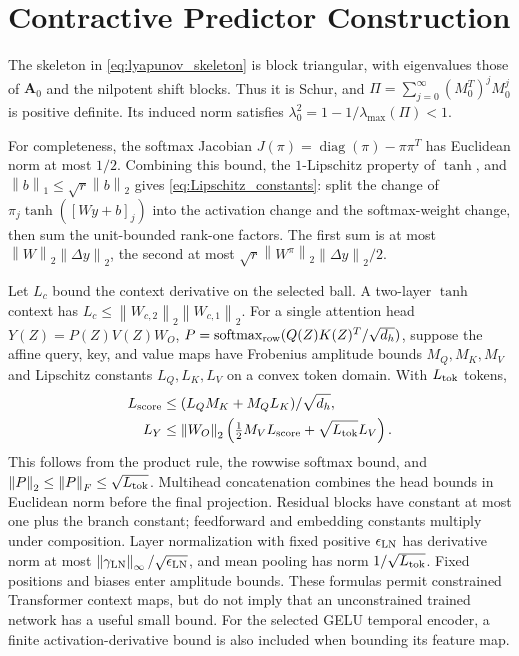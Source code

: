 \documentclass[journal]{IEEEtran}
\newcommand{\mA}{\mathbf{A}}
\newcommand{\norm}[1]{\left\lVert #1\right\rVert}
\begin{document}
\appendices
\section{Contractive Predictor Construction}
\label{app:construction}
The skeleton in \eqref{eq:lyapunov_skeleton} is block triangular, with eigenvalues those of $\mA_0$ and the nilpotent shift blocks. Thus it is Schur, and $\Pi=\sum_{j=0}^{\infty}(M_0^T)^jM_0^j$ is positive definite. Its induced norm satisfies $\lambda_0^2=1-1/\lambda_{\max}(\Pi)<1$.

For completeness, the softmax Jacobian $J(\pi)=\operatorname{diag}(\pi)-\pi\pi^T$ has Euclidean norm at most $1/2$. Combining this bound, the $1$-Lipschitz property of $\tanh$, and $\norm{b}_1\le\sqrt r\norm{b}_2$ gives \eqref{eq:Lipschitz_constants}: split the change of $\pi_j\tanh([Wy+b]_j)$ into the activation change and the softmax-weight change, then sum the unit-bounded rank-one factors. The first sum is at most $\norm{W}_2\norm{\Delta y}_2$, the second at most $\sqrt r\norm{W^\pi}_2\norm{\Delta y}_2/2$.

Let $L_c$ bound the context derivative on the selected ball. A two-layer $\tanh$ context has $L_c\le\norm{W_{c,2}}_2\norm{W_{c,1}}_2$. For a single attention head $Y(Z)=P(Z)V(Z)W_O$, $P=\operatorname{softmax}_{\rm row}(Q(Z)K(Z)^T/\sqrt{d_h})$, suppose the affine query, key, and value maps have Frobenius amplitude bounds $M_Q,M_K,M_V$ and Lipschitz constants $L_Q,L_K,L_V$ on a convex token domain. With $L_{\rm tok}$ tokens,
\begin{equation}
\begin{split}
L_{\rm score}&\le(L_QM_K+M_QL_K)/\sqrt{d_h},\\
L_Y&\le\norm{W_O}_2\left(\tfrac12M_VL_{\rm score}
+\sqrt{L_{\rm tok}}L_V\right).
\end{split}
\label{eq:attention_bound}
\end{equation}
This follows from the product rule, the rowwise softmax bound, and $\norm{P}_2\le\norm{P}_F\le\sqrt{L_{\rm tok}}$. Multihead concatenation combines the head bounds in Euclidean norm before the final projection. Residual blocks have constant at most one plus the branch constant; feedforward and embedding constants multiply under composition. Layer normalization with fixed positive $\epsilon_{\rm LN}$ has derivative norm at most $\norm{\gamma_{\rm LN}}_\infty/\sqrt{\epsilon_{\rm LN}}$, and mean pooling has norm $1/\sqrt{L_{\rm tok}}$. Fixed positions and biases enter amplitude bounds. These formulas permit constrained Transformer context maps, but do not imply that an unconstrained trained network has a useful small bound. For the selected GELU temporal encoder, a finite activation-derivative bound is also included when bounding its feature map.
\end{document}
